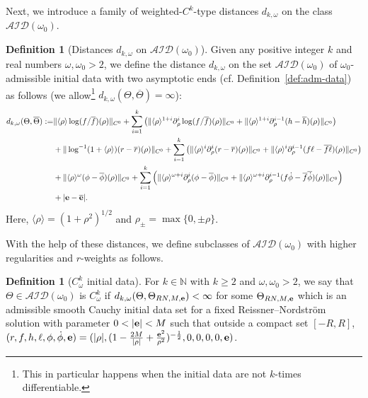 \documentclass[10pt, reqno]{amsart}
\theoremstyle{definition}
\newtheorem{definition}[theorem]{Definition}
\theoremstyle{remark}
\theoremstyle{conjecture}
\numberwithin{equation}{section}
\newcommand{\nrm}[1]{\Vert#1\Vert}
\newcommand{\brk}[1]{\langle#1\rangle}
\newcommand{\set}[1]{\{#1\}}
\newcommand{\rd}{\partial}
\newcommand{\0}{\emptyset}
\newcommand{\Tht}{\Theta}
\newcommand{\omg}{\omega}
\newcommand{\bfe}{{\bf e}}
\newcommand{\calA}{\mathcal A}
\newcommand{\calD}{\mathcal D}
\newcommand{\calI}{\mathcal I}
\newcommand{\f}{\frac}
\newcommand{\e}{\bfe}							%
\newcommand{\phibg}{\overline{\phi}}				%
\newcommand{\rbg}{\overline{r}}					%
\newcommand{\fbg}{\overline{f}}
\newcommand{\hbg}{\overline{h}}
\newcommand{\ellbg}{\overline{\ell}}
\newcommand{\dphibg}{\overline{\dot{\phi}}}
\begin{document}
Next, we introduce a family of weighted-$C^{k}$-type distances $d_{k, \omg}$ on the class $\mathcal{AID}(\omg_{0})$.
\begin{definition} [Distances $d_{k,\omg}$ on $\calA \calI \calD(\omg_{0})$]\label{def:adm-top}
Given any positive integer $k$ and real numbers $\omg, \omg_{0} > 2$, we define the distance $d_{k, \omg}$ on the set $\calA \calI \calD(\omg_{0})$ of $\omg_{0}$-admissible initial data with two asymptotic ends (cf. Definition~\ref{def:adm-data}) as follows (we allow\footnote{This in particular happens when the initial data are not $k$-times differentiable.} $d_{k, \omg} (\Tht, \overline{\Tht}) = \infty$): 
\begin{equation} \label{eq:d-k-omg}
\begin{aligned}
	d_{k, \omg} (\Tht, \overline{\Tht}) := 
	& \nrm{\brk{\rho} \log (f/\fbg)(\rho)}_{C^{0}} 
	+ \sum_{i = 1}^{k} \left(  \nrm{\brk{\rho}^{1+i} \rd_{\rho}^{i} \log (f /\fbg)(\rho)}_{C^{0}} 
					+ \nrm{\brk{\rho}^{1+i} \rd_{\rho}^{i-1} (h - \hbg)(\rho)}_{C^{0}} \right) \\
	& + \nrm{\log^{-1}(1+\brk{\rho}) (r - \rbg) (\rho)}_{C^{0}} 
	+ \sum_{i=1}^{k} \left(  \nrm{\brk{\rho}^{i} \rd_{\rho}^{i} (r - \rbg) (\rho)}_{C^{0}} 
					+ \nrm{\brk{\rho}^{i} \rd_{\rho}^{i-1} (f\ell - \fbg \ellbg)(\rho)}_{C^{0}} \right) \\
	& + \nrm{\brk{\rho}^{\omg} (\phi - \phibg)(\rho)}_{C^{0}} 
	+ \sum_{i=1}^{k} \left(  \nrm{\brk{\rho}^{\omg+i} \rd_{\rho}^{i} (\phi - \phibg)}_{C^{0}} 
	+ \nrm{\brk{\rho}^{\omg+i} \rd_{\rho}^{i-1} (f \dot{\phi} - \fbg \dphibg)(\rho)}_{C^{0}} \right) \\
	& + |{\bf e}- \overline{\bf e}|												.
\end{aligned}\end{equation}
Here, $\brk{\rho} = (1 + \rho^{2})^{1/2}$ and $\rho_{\pm} = \max\set{0, \pm \rho}$.
\end{definition}
With the help of these distances, we define subclasses of $\mathcal{AID}(\omg_{0})$ with higher regularities and $r$-weights as follows.
\begin{definition}[$C^k_{\omg}$ initial data]\label{Ck.def}
For $k\in \mathbb N$ with $k\geq 2$ and $\omg, \omg_0>2$, we say that $\Theta\in \calA \calI \calD(\omg_{0})$ is $C^k_\omg$ if 
$d_{k,\omg}(\Theta,\Theta_{RN, M,\e})<\infty$ for some $\Theta_{RN, M,\e}$ which is an admissible smooth Cauchy initial data set for a fixed Reissner--Nordstr\"om solution with parameter $0<|\e|< M$ such that outside a compact set $[-R,R]$, $(r,f,h,\ell,\phi,\dot{\phi},\e)=(|\rho|,(1-\f{2M}{|\rho|}+\f{\e^2}{\rho^2})^{-\f 12},0,0,0,0,\e)$.
\end{definition}
\end{document}
